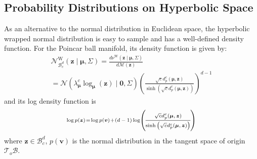 \documentclass[letterpaper]{article} %
\begin{document}

\subsection{Probability Distributions on Hyperbolic Space}\label{section:4.1}
As an alternative to the normal distribution in Euclidean space, the hyperbolic wrapped normal distribution  \cite{nagano2019wrapped,mathieu2019continuous} is easy to sample and has a well-defined density function. For the Poincar ball manifold, its density function is given by:
\begin{equation}
\begin{array}{l}
\mathcal{N}_{\mathcal{B}_{c}^{d}}^{\mathrm{W}}(\boldsymbol{z} \mid \boldsymbol{\mu}, \Sigma)=\frac{d \nu^{\mathrm{W}}(\boldsymbol{z} \mid \boldsymbol{\mu}, \Sigma)}{d \mathcal{M}(\boldsymbol{z})} \\
=\mathcal{N}\left(\lambda_{\boldsymbol{\mu}}^{c} \log _{\boldsymbol{\mu}}(\boldsymbol{z}) \mid \mathbf{0}, \Sigma\right)\left(\frac{\sqrt{c} d_{p}^{c}(\boldsymbol{\mu}, \boldsymbol{z})}{\sinh \left(\sqrt{c} d_{p}^{c}(\boldsymbol{\mu}, \boldsymbol{z})\right)}\right)^{d-1}
\end{array}
\end{equation}
and its log density function is
\begin{equation}\label{8}
\begin{scriptsize}
\log p(\boldsymbol{z})\!=\!\log p(\boldsymbol{v})\!+\!(d-1)\log\! \left(\!\frac{ \sqrt{c} d_{p}^{c}(\boldsymbol{\mu}, \boldsymbol{z})}{\sinh\left(\sqrt{c} d_{p}^{c}(\boldsymbol{\mu}, \boldsymbol{z})\right)}\!\right)
\end{scriptsize}
\end{equation}
where $\boldsymbol{z}\in \mathcal{B}_{c}^{d}$,
$p(\boldsymbol{v})$ is the normal distribution in the tangent space of origin $\mathcal{T}_{o} \mathcal{B}$.

\end{document}
